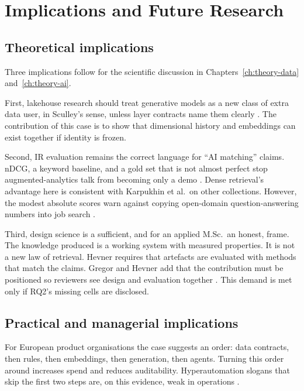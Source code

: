 \chapter{Implications and Future Research}
\label{ch:implications}

\section{Theoretical implications}
\label{sec:theory-impl}

Three implications follow for the scientific discussion in Chapters~\ref{ch:theory-data} and~\ref{ch:theory-ai}.

First, lakehouse research should treat generative models as a new class of extra data user, in Sculley's sense, unless layer contracts name them clearly . The contribution of this case is to show that dimensional history and embeddings can exist together if identity is frozen.

Second, IR evaluation remains the correct language for ``AI matching'' claims. nDCG, a keyword baseline, and a gold set that is not almost perfect stop augmented-analytics talk from becoming only a demo . Dense retrieval's advantage here is consistent with Karpukhin et al.\ on other collections. However, the modest absolute scores warn against copying open-domain question-answering numbers into job search .

Third, design science is a sufficient, and for an applied M.Sc.\ an honest, frame. The knowledge produced is a working system with measured properties. It is not a new law of retrieval. Hevner requires that artefacts are evaluated with methods that match the claims. Gregor and Hevner add that the contribution must be positioned so reviewers see design and evaluation together . This demand is met only if RQ2's missing cells are disclosed.

\section{Practical and managerial implications}
\label{sec:practical-impl}

For European product organisations the case suggests an order: data contracts, then rules, then embeddings, then generation, then agents. Turning this order around increases spend and reduces auditability. Hyperautomation slogans that skip the first two steps are, on this evidence, weak in operations .

